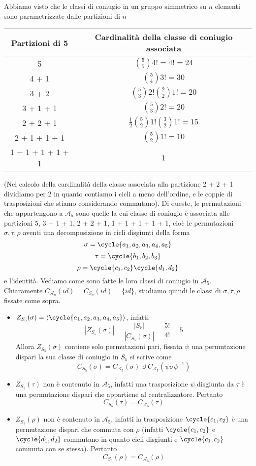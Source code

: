 \documentclass[11pt]{scrartcl}
\begin{document}
Abbiamo visto che le classi di coniugio in un gruppo simmetrico su $n$ elementi
sono parametrizzate dalle partizioni di $n$
\begingroup
\renewcommand{\arraystretch}{2}
\begin{center}
    \begin{tabular}{c|c}
        Partizioni di 5 & Cardinalità della classe di coniugio associata\\
        \hline
        5 & $\displaystyle\binom{5}{5}4! = 4! = 24$\\
        4 + 1 & $\displaystyle\binom{5}{4}3! = 30$\\
        3 + 2 & $\displaystyle\binom{5}{3}2!\binom{2}{2}1! = 20$\\
        3 + 1 + 1 & $\displaystyle\binom{5}{3}2! = 20$\\
        2 + 2 + 1 & $\displaystyle\frac 1 2\binom{5}{2}1!\binom{3}{2}1! = 15$\\
        2 + 1 + 1 + 1 & $\displaystyle\binom{5}{2}1! = 10$\\
        1 + 1 + 1 + 1 + 1 & $1$
    \end{tabular}
\end{center}
\endgroup
(Nel calcolo della cardinalità della classe associata alla partizione 2 + 2 + 1
dividiamo per 2 in quanto contiamo i cicli a meno dell'ordine, e
le coppie di trasposizioni che stiamo considerando commutano).
Di queste, le permutazioni che appartengono a $\mathcal{A}_5$ sono quelle
la cui classe di coniugio è associata alle partizioni 5, 3 + 1 + 1, 
2 + 2 + 1, 1 + 1 + 1 + 1 + 1, cioè le permutazioni $\sigma, \tau, \rho$
aventi una decomposizione in cicli disgiunti della forma
\[
    \sigma = \cycle{a_1, a_2, a_3, a_4, a_5}
\]
\[
    \tau = \cycle{b_1, b_2, b_3}
\]
\[
    \rho = \cycle{c_1, c_2}\cycle{d_1, d_2}
\]
e l'identità. Vediamo come sono fatte le loro classi di coniugio in $\mathcal{A}_5$.
Chiaramente $C_{\mathcal{A}_n}(id) = C_{S_n}(id) = \{id\}$, studiamo quindi
le classi di $\sigma, \tau, \rho$ fissate come sopra.
\begin{itemize}
    \item $Z_{S_5}(\sigma) = \langle\cycle{a_1, a_2, a_3, a_4, a_5}\rangle$,
    infatti 
    \[
        |Z_{S_5}(\sigma)| = \frac{|S_5|}{|C_{S_5}(\sigma)|} = \frac{5!}{4!} = 5
    \]
    Allora $Z_{S_5}(\sigma)$ contiene solo permutazioni pari, fissata $\psi$
    una permutazione dispari la sua
    classe di coniugio in $S_5$ si scrive come
    \[
        C_{S_5}(\sigma) = C_{\mathcal{A}_5}(\sigma) \cupdot C_{\mathcal{A}_5}(\psi\sigma\psi^{-1})
    \]
    \item $Z_{S_5}(\tau)$ non è contenuto in $\mathcal{A}_5$, infatti una
    trasposizione $\psi$ disgiunta da $\tau$ è una permutazione dispari che
    appartiene al centralizzatore. Pertanto
    \[
        C_{S_5}(\tau) = C_{\mathcal{A}_5}(\tau)
    \]
    \item $Z_{S_5}(\rho)$ non è contenuto in $\mathcal{A}_5$, infatti la 
    trasposizione $\cycle{c_1, c_2}$ è una permutazione dispari che commuta
    con $\rho$ (infatti $\cycle{c_1, c_2}$ e $\cycle{d_1, d_2}$ commutano in 
    quanto cicli disgiunti e $\cycle{c_1, c_2}$ commuta con se stessa).
    Pertanto 
    \[
        C_{S_5}(\rho) = C_{\mathcal{A}_5}(\rho)
    \]
\end{itemize}
\end{document}
